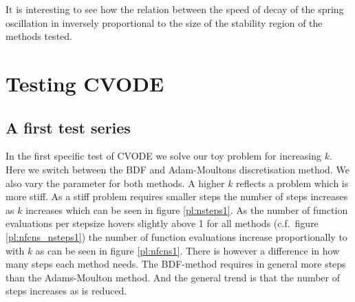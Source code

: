 \documentclass{report}
\begin{document}
It is interesting to see how the relation between the speed of decay of the spring oscillation in inversely proportional to the size of the stability region of the methods tested.


\newpage
\newpage


\section*{Testing CVODE}
\subsection*{A first test series}

In the first specific test of CVODE we solve our toy problem for increasing $k$. Here we switch between the BDF and Adam-Moultons discretisation method. We also vary the  parameter for both methods.
A higher $k$ reflects a problem which is more stiff. As a stiff problem requires smaller steps the number of steps  increases as $k$ increases which  can be seen in figure \ref{pl:nsteps1}. As the number of function evaluations per stepsize  hovers slightly above 1 for all methods (c.f.\ figure \ref{pl:nfcns_nsteps1}) the number of function evaluations increase proportionally to  with $k$ as can be seen in figure \ref{pl:nfcns1}. There is however a difference in how many steps each method needs. The BDF-method requires in general more steps than the Adams-Moulton method. And the general trend is that the number of steps increases as  is reduced. 
\end{document}
